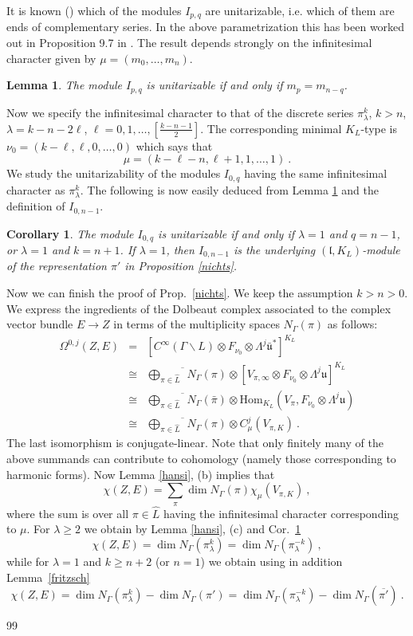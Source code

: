 \documentclass[10]{amsart}
\newtheorem{lem}[thm]{Lemma}
\newtheorem{cor}[thm]{Corollary}
\theoremstyle{remark}
\theoremstyle{definition}
\numberwithin{equation}{section}
\newcommand{\Hom}{\mathrm{Hom}}
\newcommand{\fl}{{\mathfrak l}}
\newcommand{\fu}{{\mathfrak u}}
\begin{document}
{It is known (\cite{KnS71}) which of the modules $I_{p,q}$ are unitarizable, i.e. which of them are ends of complementary series. In the above parametrization this has been worked out in Proposition 9.7 in \cite{Ol02}. The result depends strongly
on the infinitesimal character given by $\mu=(m_0,\dots,m_n)$.

\begin{lem}\label{riedel}
The module $I_{p,q}$ is unitarizable if and only if $m_p=m_{n-q}$.
\end{lem}

Now we specify the infinitesimal character to that of the discrete series $\pi_\lambda^k$, $k>n$, $\lambda=k-n-2\ell$, $\ell=0,1,\dots,[\frac{k-n-1}{2}]$.
The corresponding minimal $K_L$-type is $\nu_0=(k-\ell,\ell,0,\dots,0)$ which says that 
$$\mu=(k-\ell-n, \ell+1,1,\dots,1)\ .$$
We study the unitarizability of the modules $I_{0,q}$ having the same infinitesimal character as $\pi_\lambda^k$. The following is now easily deduced from Lemma \ref{riedel}
and the definition of $I_{0,n-1}$.

\begin{cor}\label{heidler}
The module $I_{0,q}$ is unitarizable if and only if $\lambda=1$ and $q=n-1$, or $\lambda=1$ and $k=n+1$.
If $\lambda=1$, then $I_{0,n-1}$ is the underlying $(\fl,K_L)$-module of the representation $\pi'$ in Proposition \ref{nichts}.
\end{cor}

Now we can finish the proof of Prop.~\ref{nichts}. We keep the assumption $k>n>0$. 
We express the ingredients of the Dolbeaut complex associated to the complex vector bundle $E\rightarrow Z$ in terms of the multiplicity spaces $N_\Gamma(\pi)$ as follows:
\begin{eqnarray*}
\Omega^{0,j}(Z,E)&=&\left[ C^\infty(\Gamma\backslash L)\otimes F_{\nu_0}\otimes\Lambda^j\bar\fu^* \right]^{K_L}\\
&\cong& \overline{\bigoplus_{\pi\in\widehat L}}N_\Gamma(\pi)\otimes \left[V_{\pi,\infty}\otimes F_{\nu_0}\otimes\Lambda^j\fu \right]^{K_L}\\
&\cong& \overline{\bigoplus_{\pi\in\widehat L}}N_\Gamma(\bar\pi)\otimes \Hom_{K_L}(V_\pi, F_{\nu_0}\otimes\Lambda^j\fu)\\
&\cong& \overline{\bigoplus_{\pi\in\widehat L}}N_\Gamma(\pi)\otimes C^j_\mu(V_{\pi,K})\ .
\end{eqnarray*}
The last isomorphism is conjugate-linear. Note that only finitely many of the above summands can contribute to cohomology (namely those corresponding to harmonic forms).
Now Lemma \ref{hansi}, (b) implies that
$$ \chi(Z,E)=\sum_\pi \dim N_\Gamma(\pi) \chi_\mu(V_{\pi,K}) \ ,$$
where the sum is over all $\pi\in \widehat L$ having the infinitesimal character corresponding to $\mu$. For $\lambda\ge 2$ we obtain by Lemma \ref{hansi}, (c) and Cor.~\ref{heidler}
$$\chi(Z,E)= \dim N_\Gamma(\pi_\lambda^k)=\dim N_\Gamma(\pi_\lambda^{-k})\ ,$$
while for $\lambda=1$ and $k\ge n+2$ (or $n=1$) we obtain using in addition Lemma~\ref{fritzsch}
$$\chi(Z,E)= \dim N_\Gamma(\pi_\lambda^k)-\dim N_\Gamma(\pi')=\dim N_\Gamma(\pi_\lambda^{-k})-\dim N_\Gamma(\overline{\pi'})\ .$$
\begin{thebibliography}{99}


\end{thebibliography}}
\end{document}

